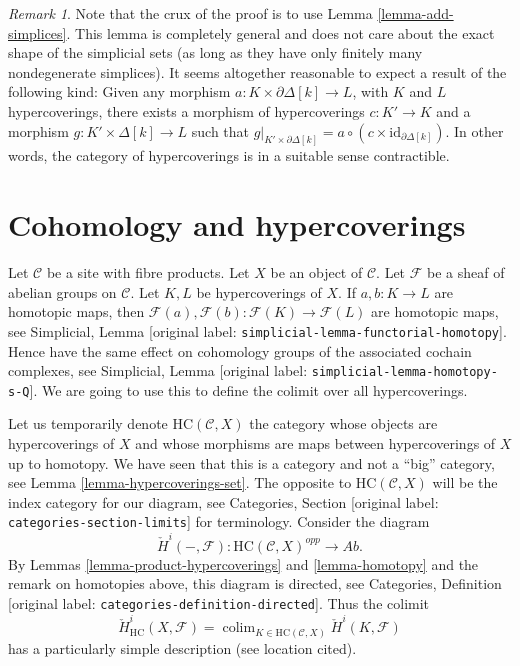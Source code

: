 \documentclass[10pt,a4paper]{article}
\theoremstyle{plain}
\theoremstyle{definition}
\theoremstyle{remark}
\newtheorem{remark}[subsection]{Remark}
\numberwithin{equation}{subsection}
\def\colim{\mathop{\mathrm{colim}}\nolimits}
\begin{document}
\begin{remark}
\label{remark-contractible-category}
Note that the crux of the proof is to use
Lemma \ref{lemma-add-simplices}. This lemma
is completely general and does not care about the
exact shape of the simplicial sets (as long as they
have only finitely many nondegenerate simplices).
It seems altogether reasonable to expect a result
of the following kind:
Given any morphism $a : K \times \partial \Delta[k]
\to L$, with $K$ and $L$ hypercoverings, there
exists a morphism of hypercoverings $c : K' \to K$
and a morphism  $g : K' \times \Delta[k] \to L$
such that
$g|_{K' \times \partial \Delta[k]} =
a \circ (c \times \text{id}_{\partial \Delta[k]})$.
In other words, the category of hypercoverings is in
a suitable sense contractible.
\end{remark}

















\section{Cohomology and hypercoverings}
\label{section-cohomology}

\noindent
Let $\mathcal{C}$ be a site with fibre products.
Let $X$ be an object of $\mathcal{C}$.
Let $\mathcal{F}$ be a sheaf of abelian groups on $\mathcal{C}$.
Let $K, L$ be hypercoverings of $X$.
If $a, b : K \to L$ are homotopic maps,
then $\mathcal{F}(a), \mathcal{F}(b) : \mathcal{F}(K) \to \mathcal{F}(L)$
are homotopic maps, see
Simplicial, Lemma \textnormal{[original label: \nolinkurl{simplicial-lemma-functorial-homotopy}]}.
Hence have the same effect on cohomology groups of the associated
cochain complexes, see
Simplicial, Lemma \textnormal{[original label: \nolinkurl{simplicial-lemma-homotopy-s-Q}]}.
We are going to use this to define the colimit over all
hypercoverings.

\medskip\noindent
Let us temporarily denote $\text{HC}(\mathcal{C}, X)$
the category whose objects are hypercoverings of $X$
and whose morphisms are maps between hypercoverings of $X$
up to homotopy. We have seen that
this is a category and not a ``big'' category,
see Lemma \ref{lemma-hypercoverings-set}.
The opposite to $\text{HC}(\mathcal{C}, X)$
will be the index category for our diagram, see
Categories, Section \textnormal{[original label: \nolinkurl{categories-section-limits}]} for terminology.
Consider the diagram
$$
\check{H}^i(-, \mathcal{F}) :
\text{HC}(\mathcal{C}, X)^{opp}
\longrightarrow
\textit{Ab}.
$$
By Lemmas \ref{lemma-product-hypercoverings} and \ref{lemma-homotopy}
and the remark on homotopies above, this diagram is directed, see
Categories, Definition \textnormal{[original label: \nolinkurl{categories-definition-directed}]}.
Thus the colimit
$$
\check{H}^i_{\text{HC}}(X, \mathcal{F}) =
\colim_{K \in \text{HC}(\mathcal{C}, X)} \check{H}^i(K, \mathcal{F})
$$
has a particularly simple description (see location cited).
\end{document}
